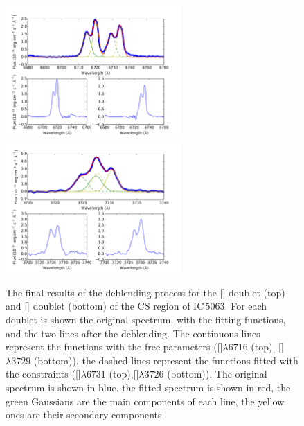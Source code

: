 \documentclass[../main.tex]{subfiles}
\begin{document}
\begin{figure}
\centering
\includegraphics[width=0.6\textwidth]{images/paper1/s2.pdf} \\
\vskip0.2cm
\includegraphics[width=0.6\textwidth]{images/paper1/o2.pdf}\\
\caption[]{The final results of the deblending process for the [] doublet (top) and [] doublet (bottom) of the CS region of IC\,5063. For each doublet is shown the original spectrum, with the fitting functions, and the two lines after the deblending. The continuous lines represent the functions with the free parameters ([]$\lambda6716$ (top), []$\lambda3729$ (bottom)), the dashed lines represent the functions fitted with the constraints ([]$\lambda6731$ (top),[]$\lambda3726$ (bottom)). The original spectrum is shown in blue, the fitted spectrum is shown in red, the green Gaussians are the main components of each line, the yellow ones are their secondary components. }
\label{fig:deb}
\end{figure}
\end{document}
